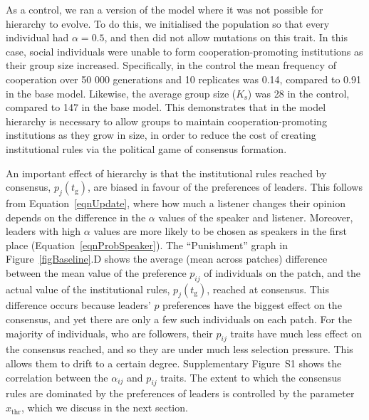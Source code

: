 \documentclass{rstb}
\begin{document}
\begin{linenumbers}
 As a control, we ran a version of the model where it was not possible for hierarchy to evolve. To do this, we initialised the population so that every individual had $\alpha=0.5$, and then did not allow mutations on this trait. In this case, social individuals were unable to form cooperation-promoting institutions as their group size increased. Specifically, in the control the mean frequency of cooperation over 50 000 generations and 10 replicates was 0.14, compared to 0.91 in the base model. Likewise, the average group size ($K_\mathrm{s}$) was 28 in the control, compared to 147 in the base model. This demonstrates that in the model hierarchy is necessary to allow groups to maintain cooperation-promoting institutions as they grow in size, in order to reduce the cost of creating institutional rules via the political game of consensus formation. 

An important effect of hierarchy is that the institutional rules reached by consensus, $p_j(t_\mathrm{g})$, are biased in favour of the preferences of leaders. This follows from Equation~\ref{eqnUpdate}, where how much a listener changes their opinion depends on the difference in the $\alpha$ values of the speaker and listener. Moreover, leaders with high $\alpha$ values are more likely to be chosen as speakers in the first place (Equation~\ref{eqnProbSpeaker}). The ``Punishment'' graph in Figure~\ref{figBaseline}.D shows the average (mean across patches) difference between the mean value of the preference $p_{ij}$ of individuals on the patch, and the actual value of the institutional rules, $p_j(t_\mathrm{g})$, reached at consensus. This difference occurs because leaders' $p$ preferences have the biggest effect on the consensus, and yet there are only a few such individuals on each patch. For the majority of individuals, who are followers, their $p_{ij}$ traits have much less effect on the consensus reached, and so they are under much less selection pressure. This allows them to drift to a certain degree. Supplementary Figure~S1 shows the correlation between the $\alpha_{ij}$ and $p_{ij}$ traits. The extent to which the consensus rules are dominated by the preferences of leaders is controlled by the parameter $x_\mathrm{thr}$, which we discuss in the next section. 


\end{linenumbers}
\end{document}
